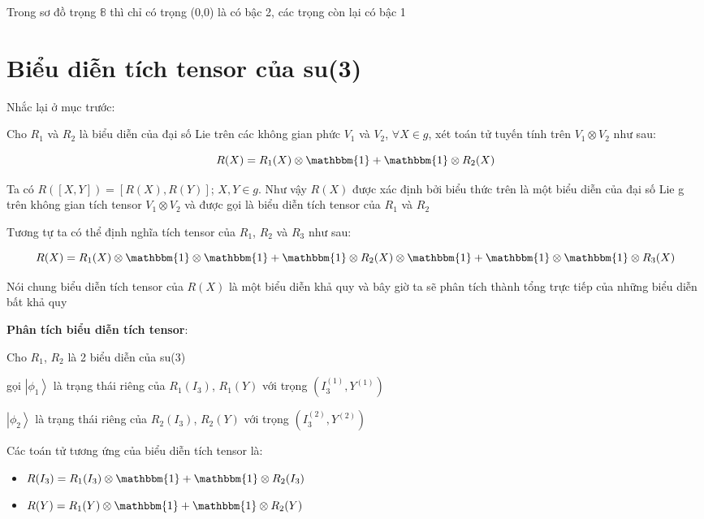 \documentclass{report}
\begin{document}
Trong sơ đồ trọng \( \mathbb{8} \) thì chỉ có trọng (0,0) là có bậc 2, các trọng còn lại có bậc 1

\section{Biểu diễn tích tensor của su(3)}

Nhắc lại ở mục trước:

Cho \( R_{1} \) và \( R_{2} \) là biểu diễn của đại số Lie trên các không gian phức \( V_{1} \) và \( V_{2} \), \( \forall X \in g \), xét toán tử tuyến tính trên \( V_{1} \otimes V_{2} \) như sau:

\[ R(X) = R_{1}(X) \otimes \mathbbm{1} + \mathbbm{1} \otimes R_{2}(X) \]

Ta có \( R \left( \left[ X, Y \right] \right) = \left[ R(X), R(Y) \right] \); \( X, Y \in g \). Như vậy \( R(X) \) được xác định bởi biểu thức trên là một biểu diễn của đại số Lie g trên không gian tích tensor \( V_{1} \otimes V_{2} \) và được gọi là biểu diễn tích tensor của \( R_{1} \) và \( R_{2} \)

Tương tự ta có thể định nghĩa tích tensor của \( R_{1} \), \( R_{2} \) và \( R_{3} \) như sau:

\[ R(X) = R_{1}(X) \otimes \mathbbm{1} \otimes \mathbbm{1} + \mathbbm{1} \otimes R_{2}(X) \otimes \mathbbm{1} + \mathbbm{1} \otimes \mathbbm{1} \otimes R_{3}(X) \]

Nói chung biểu diễn tích tensor của \( R(X) \) là một biểu diễn khả quy và bây giờ ta sẽ phân tích thành tổng trực tiếp của những biểu diễn bất khả quy

\textbf{Phân tích biểu diễn tích tensor}:

Cho \( R_{1} \), \( R_{2} \) là 2 biểu diễn của su(3)

\hspace*{0.5cm} gọi \( \left| \phi_{1} \right\rangle \) là trạng thái riêng của \( R_{1}(I_{3}) \), \( R_{1}(Y) \) với trọng \( \left( I_{3}^{(1)}, Y^{(1)} \right) \)

\hspace*{1.1cm} \( \left| \phi_{2} \right\rangle \) là trạng thái riêng của \( R_{2}(I_{3}) \), \( R_{2}(Y) \) với trọng \( \left( I_{3}^{(2)}, Y^{(2)} \right) \)

Các toán tử tương ứng của biểu diễn tích tensor là:

	\begin{itemize}
		\item \( R(I_{3}) = R_{1}(I_{3}) \otimes \mathbbm{1} + \mathbbm{1} \otimes R_{2}(I_{3}) \)
		\item \( R(Y) = R_{1}(Y) \otimes \mathbbm{1} + \mathbbm{1} \otimes R_{2}(Y) \)
	\end{itemize}
\end{document}
